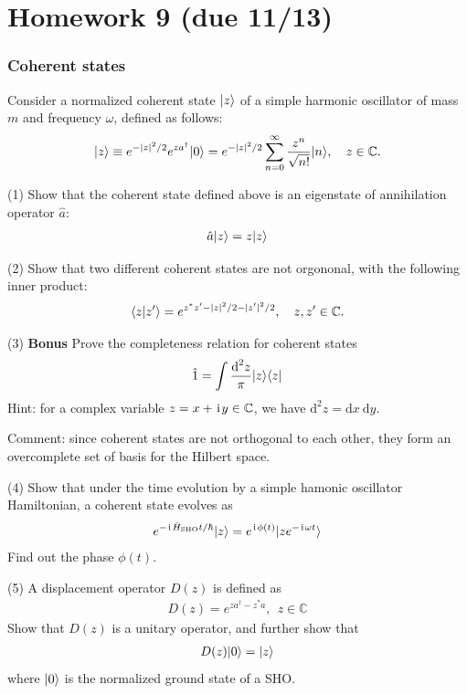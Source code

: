 \chapter{Homework 9 (due 11/13)}

\subsection{Coherent states}

Consider a normalized coherent state $|{z}\rangle$ of a simple harmonic oscillator of mass $m$ and frequency $\omega$, defined as follows:
\begin{align}
|{z}\rangle\equiv e^{-|z|^2/2}e^{za^\dagger}|{0}\rangle=e^{-|z|^2/2}\sum_{n=0}^\infty\frac{z^n}{\sqrt{n!}}|{n}\rangle,~~~z\in\mathbb{C}.
\end{align}

(1) Show that the coherent state defined above is an eigenstate of annihilation operator $\hat a$:
\begin{align}
\hat a|{z}\rangle=z|{z}\rangle
\end{align}

(2) Show that two different coherent states are not orgononal, with the following inner product:
\begin{align}
\langle{z|z^\prime}\rangle=e^{z^\ast z^\prime-|z|^2/2-|z^\prime|^2/2},~~~z,z^\prime\in\mathbb{C}.
\end{align}

(3) \textbf{Bonus} Prove the completeness relation for coherent states
\begin{align}
\hat 1=\int\frac{\text{d}^2z}{\pi}|{z}\rangle\langle{z}|
\end{align}
Hint: for a complex variable $z=x+\hspace{1pt}\mathrm{i}\hspace{1pt} y\in\mathbb{C}$, we have $\text{d}^2z=\text{d}x~\text{d}y$.

Comment: since coherent states are not orthogonal to each other, they form an overcomplete set of basis for the Hilbert space. 

(4) Show that under the time evolution by a simple hamonic oscillator Hamiltonian, a coherent state evolves as
\begin{align}
e^{-\hspace{1pt}\mathrm{i}\hspace{1pt}\hat H_\text{SHO}t/\hbar}|{z}\rangle=e^{\hspace{1pt}\mathrm{i}\hspace{1pt}\phi(t)}|{ze^{-\hspace{1pt}\mathrm{i}\hspace{1pt}\omega t}}\rangle
\end{align}
Find out the phase $\phi(t)$. 

(5) A displacement operator $D(z)$ is defined as
\begin{align}\label{displacement operator}
D(z)=e^{za^\dagger-z^\ast a},~~z\in\mathbb{C}
\end{align}
Show that $D(z)$ is a unitary operator, and further show that
\begin{align}
D(z)|{0}\rangle=|{z}\rangle
\end{align}
where $|{0}\rangle$ is the normalized ground state of a SHO. 

